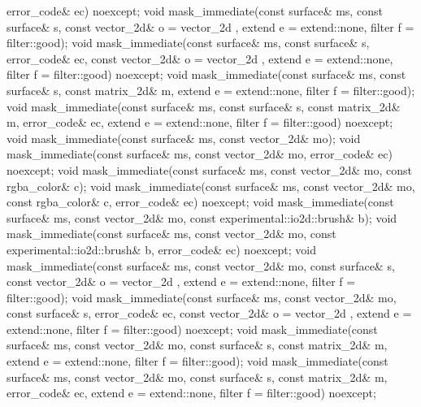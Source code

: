 \begin{codeblock}
{{{{{      error_code& ec) noexcept;
    void mask_immediate(const surface& ms, const surface& s,
      const vector_2d& o = vector_2d{ }, extend e = extend::none,
      filter f = filter::good);
    void mask_immediate(const surface& ms, const surface& s, error_code& ec,
      const vector_2d& o = vector_2d{ }, extend e = extend::none,
      filter f = filter::good) noexcept;
    void mask_immediate(const surface& ms, const surface& s, const matrix_2d& m,
      extend e = extend::none, filter f = filter::good);
    void mask_immediate(const surface& ms, const surface& s,
      const matrix_2d& m, error_code& ec, extend e = extend::none,
      filter f = filter::good) noexcept;
    void mask_immediate(const surface& ms, const vector_2d& mo);
    void mask_immediate(const surface& ms, const vector_2d& mo, error_code& ec)
      noexcept;
    void mask_immediate(const surface& ms, const vector_2d& mo,
      const rgba_color& c);
    void mask_immediate(const surface& ms, const vector_2d& mo,
      const rgba_color& c, error_code& ec) noexcept;
    void mask_immediate(const surface& ms, const vector_2d& mo,
      const experimental::io2d::brush& b);
    void mask_immediate(const surface& ms, const vector_2d& mo,
      const experimental::io2d::brush& b, error_code& ec) noexcept;
    void mask_immediate(const surface& ms, const vector_2d& mo,
      const surface& s, const vector_2d& o = vector_2d{ },
      extend e = extend::none, filter f = filter::good);
    void mask_immediate(const surface& ms, const vector_2d& mo,
      const surface& s, error_code& ec, const vector_2d& o = vector_2d{ },
      extend e = extend::none, filter f = filter::good) noexcept;
    void mask_immediate(const surface& ms, const vector_2d& mo,
      const surface& s, const matrix_2d& m, extend e = extend::none,
      filter f = filter::good);
    void mask_immediate(const surface& ms, const vector_2d& mo,
      const surface& s, const matrix_2d& m, error_code& ec,
      extend e = extend::none, filter f = filter::good) noexcept;
    
}}}}}
\end{codeblock}

